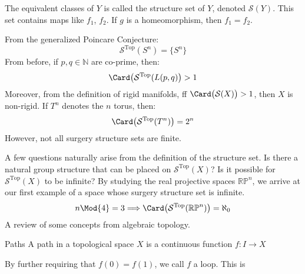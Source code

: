 \documentclass[crop=false,class=book,oneside]{standalone}
\begin{document}
            The equivalent classes of $Y$ is called the
            structure set of $Y$,
            denoted $\mathcal{S}(Y)$. This set contains maps
            like $f_{1}$, $f_{2}$.
            If $g$ is a homeomorphism, then $f_{1}=f_{2}$.
            \begin{lexample}
                From the generalized Poincare Conjecture:
                \begin{equation}
                    \mathcal{S}^{\textrm{Top}}(S^{n})
                    =\{S^{n}\}
                \end{equation}
                From before, if $p,q\in\mathbb{N}$ are co-prime, then:
                \begin{equation}
                    \Card\big(\mathcal{S}^{\textrm{Top}}(L(p,q)\big)>1
                \end{equation}
                Moreover, from the definition of rigid manifolds,
                ff $\Card\big(\mathcal{S}(X)\big)>1$, then $X$ is non-rigid.
                If $T^{n}$ denotes the $n$ torus, then:
                \begin{equation}
                    \Card\big(\mathcal{S}^{\textrm{Top}}(T^{n})\big)
                    =2^{n}
                \end{equation}
                However, not all surgery structure sets are finite.
            \end{lexample}
            A few questions naturally arise from the
            definition of the structure set. Is there a natural group
            structure that can be placed on $\mathcal{S}^{\textrm{Top}}(X)$?
            Is it possible for $\mathcal{S}^{\textrm{Top}}(X)$ to be infinite?
            By studying the real projective spaces $\mathbb{RP}^{n}$, we
            arrive at our first example of a space whose surgery structure
            set is infinite.
            \begin{equation}
                n\Mod{4}=3
                \Longrightarrow
                \Card\big(\mathcal{S}^{\textrm{Top}}(\mathbb{RP}^{n})\big)
                =\aleph_{0}
            \end{equation}
            A review of some concepts from algebraic topology.
            \begin{ldefinition}{Paths}
                A path in a topological space $X$ is a
                continuous function $f:I\rightarrow{X}$
            \end{ldefinition}
            By further requiring that $f(0)=f(1)$, we call $f$ a loop. This is
\end{document}

